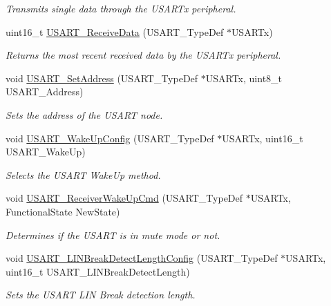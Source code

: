 \begin{DoxyCompactItemize}
\begin{DoxyCompactList}\small\item\em Transmits single data through the U\+S\+A\+R\+Tx peripheral. \end{DoxyCompactList}\item 
uint16\+\_\+t \mbox{\hyperlink{group___u_s_a_r_t_gac67a91845b0b1d54d31bdfb1c5e9867c}{U\+S\+A\+R\+T\+\_\+\+Receive\+Data}} (U\+S\+A\+R\+T\+\_\+\+Type\+Def $\ast$U\+S\+A\+R\+Tx)
\begin{DoxyCompactList}\small\item\em Returns the most recent received data by the U\+S\+A\+R\+Tx peripheral. \end{DoxyCompactList}\item 
void \mbox{\hyperlink{group___u_s_a_r_t_ga65ec9928817f3f031dd9a4dfc95d6666}{U\+S\+A\+R\+T\+\_\+\+Set\+Address}} (U\+S\+A\+R\+T\+\_\+\+Type\+Def $\ast$U\+S\+A\+R\+Tx, uint8\+\_\+t U\+S\+A\+R\+T\+\_\+\+Address)
\begin{DoxyCompactList}\small\item\em Sets the address of the U\+S\+A\+RT node. \end{DoxyCompactList}\item 
void \mbox{\hyperlink{group___u_s_a_r_t_ga4965417c2412c36e462fcad50a8d5393}{U\+S\+A\+R\+T\+\_\+\+Wake\+Up\+Config}} (U\+S\+A\+R\+T\+\_\+\+Type\+Def $\ast$U\+S\+A\+R\+Tx, uint16\+\_\+t U\+S\+A\+R\+T\+\_\+\+Wake\+Up)
\begin{DoxyCompactList}\small\item\em Selects the U\+S\+A\+RT Wake\+Up method. \end{DoxyCompactList}\item 
void \mbox{\hyperlink{group___u_s_a_r_t_gac27b78ce445a16fe33851d2f87781c02}{U\+S\+A\+R\+T\+\_\+\+Receiver\+Wake\+Up\+Cmd}} (U\+S\+A\+R\+T\+\_\+\+Type\+Def $\ast$U\+S\+A\+R\+Tx, Functional\+State New\+State)
\begin{DoxyCompactList}\small\item\em Determines if the U\+S\+A\+RT is in mute mode or not. \end{DoxyCompactList}\item 
void \mbox{\hyperlink{group___u_s_a_r_t_ga7bc2d291831cbc5e53e73337308029b5}{U\+S\+A\+R\+T\+\_\+\+L\+I\+N\+Break\+Detect\+Length\+Config}} (U\+S\+A\+R\+T\+\_\+\+Type\+Def $\ast$U\+S\+A\+R\+Tx, uint16\+\_\+t U\+S\+A\+R\+T\+\_\+\+L\+I\+N\+Break\+Detect\+Length)
\begin{DoxyCompactList}\small\item\em Sets the U\+S\+A\+RT L\+IN Break detection length. \end{DoxyCompactList}\item 

\end{DoxyCompactItemize}
